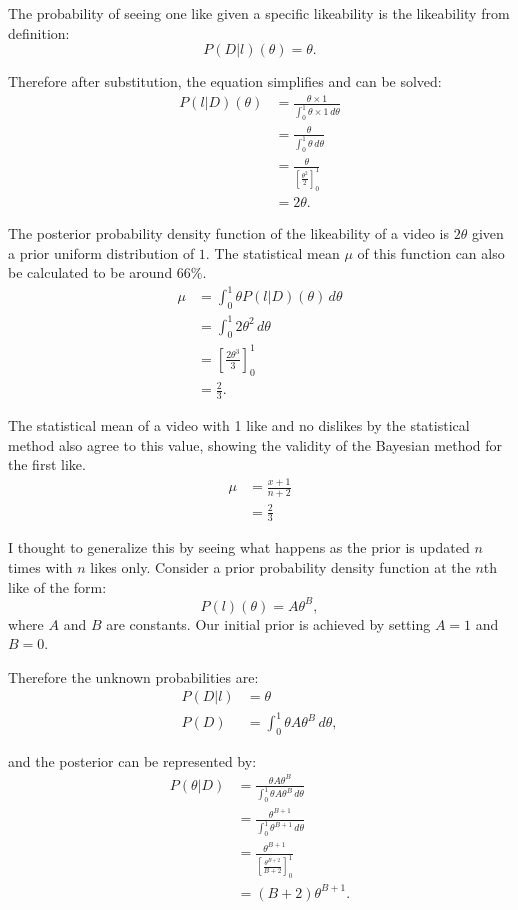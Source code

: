 \documentclass[a4paper,11pt]{article}
\begin{document}
The probability of seeing one like given a specific likeability is the likeability from definition:
\[
    P(D|l)(\theta) = \theta.
\]

Therefore after substitution, the equation simplifies and can be solved:
\begin{align*}
    P(l|D)(\theta) &= \frac{\theta \times 1}{\int_{0}^{1} \theta \times 1 \, d\theta}\\
    &= \frac{\theta}{\int_0^1 \theta \, d\theta}\\
    &= \frac{\theta}{[\frac{\theta^2}{2}]^1_0}\\
    &= 2\theta.
\end{align*}

\newpage
The posterior probability density function of the likeability of a video is $2\theta$ given a prior uniform distribution of $1$. The statistical mean $\mu$ of this function can also be calculated to be around $66\%$.
\begin{align*}
    \mu &= \int_0^1 \theta P(l|D)(\theta) \, d\theta\\
    &= \int_0^1 2\theta^2 \, d\theta\\
    &= [\frac{2\theta^3}{3}]^1_0\\
    &= \frac{2}{3}.
\end{align*}

The statistical mean of a video with 1 like and no dislikes by the statistical method also agree to this value, showing the validity of the Bayesian method for the first like.
\begin{align*}
    \mu &= \frac{x+1}{n+2}\\
        &= \frac{2}{3}
\end{align*}

I thought to generalize this by seeing what happens as the prior is updated $n$ times with $n$ likes only. Consider a prior probability density function at the $n$th like of the form:
\[
    P(l)(\theta) = A \theta^B,
\]
where $A$ and $B$ are constants. Our initial prior is achieved by setting $A=1$ and $B=0$.

Therefore the unknown probabilities are:
\begin{align*}
    P(D|l) &= \theta\\
    P(D) &= \int_0^1 \theta A\theta^B \, d\theta,
\end{align*}

and the posterior can be represented by:
\begin{align*}
    P(\theta|D) &= \frac{\theta A\theta^B}{\int_0^1 \theta A\theta^B \, d\theta}\\
    &= \frac{\theta^{B+1}}{\int_0^1 \theta^{B+1} \, d\theta}\\
    &= \frac{\theta^{B+1}}{[\frac{\theta^{B+2}}{B+2}]^1_0}\\
    &= (B+2) \theta^{B+1}.
\end{align*}
\end{document}
